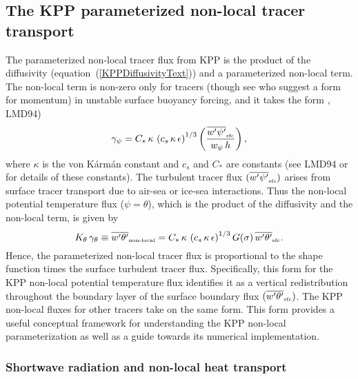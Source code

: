 \documentclass[preprint,12pt,authoryear]{agujournal}
\begin{document}
\subsection{The KPP parameterized non-local tracer transport}
\label{subsection:non-local-transport}

The parameterized non-local tracer flux from KPP is the product of the diffusivity (equation~(\ref{KPPDiffusivityText})) and a parameterized non-local term. The non-local term is non-zero only for tracers (though see \citet{Smyth2002} who suggest a form for momentum) in unstable surface buoyancy forcing, and it takes the form 
\cite{Mailhot1982}, LMD94)
\begin{equation}
\label{eq:gammab-defined}
\gamma_\psi = C_* \, \kappa \, \left(c_s \, \kappa \, \epsilon \right)^{1/3} 
 \left( 
 \frac{\overline{w^\prime \psi^\prime}_{\mbox{\tiny sfc}}}{w_\psi \, h} 
 \right), 
\end{equation}
where $\kappa$ is the von K\'arm\'an constant and $c_s$ and $C_{*}$ are constants (see LMD94 or \cite{Griffies2015} for details of these constants).  The turbulent tracer flux $(\overline{w^\prime \psi^\prime}_{\mbox{\tiny sfc}})$ arises from surface tracer transport due to air-sea or ice-sea interactions. Thus the non-local potential temperature flux ($\psi = \theta$), which is the product of the diffusivity and the non-local term, is given by
\begin{equation}
\label{non-localFlux}
K_\theta \, \gamma_\theta \equiv 
 \overline{w^\prime \theta^\prime}_{\mbox{\tiny non-local}} 
 = C_* \, \kappa \, \left(c_s \, \kappa \, \epsilon\right)^{1/3} G(\sigma) \, \overline{w^\prime \theta^\prime}_{\mbox{\tiny sfc}}.
\end{equation}
Hence, the parameterized non-local tracer flux is proportional to the shape function times the surface turbulent tracer flux. Specifically, this form for the KPP non-local potential temperature flux identifies it as a vertical redistribution throughout the boundary layer of the surface boundary flux $(\overline{w^\prime \theta^\prime}_{\mbox{\tiny sfc}})$.  The KPP non-local fluxes for other tracers take on the same form.  This form provides a useful conceptual framework for understanding the KPP non-local parameterization as well as a guide towards its numerical implementation.  

\subsubsection{Shortwave radiation and non-local heat transport}
\end{document}
